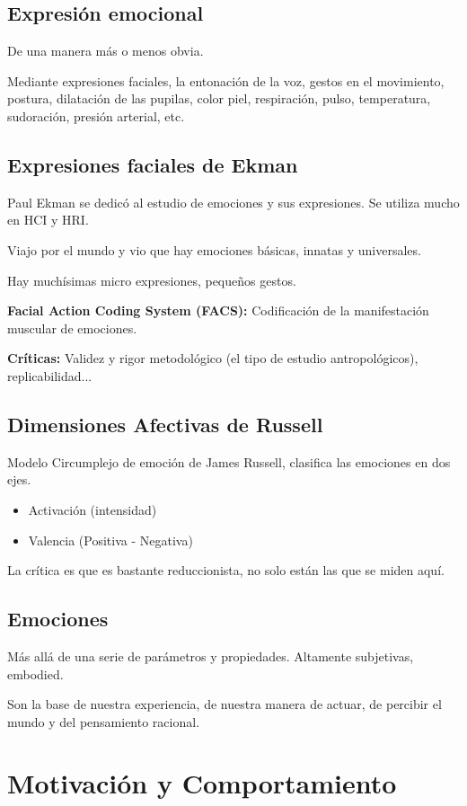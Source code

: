 \documentclass[12pt, twoside, openright]{report} %
\begin{document}
\subsection{Expresión emocional}
De una manera más o menos obvia. 

Mediante expresiones faciales, la entonación de la voz, gestos en el movimiento, postura, dilatación de las pupilas, color piel, respiración, pulso, temperatura, sudoración, presión arterial, etc.

\subsection{Expresiones faciales de Ekman}
Paul Ekman se dedicó al estudio de emociones y sus expresiones. Se utiliza mucho en HCI y HRI.

Viajo por el mundo y vio que hay emociones básicas, innatas y universales.
  
Hay muchísimas micro expresiones, pequeños gestos.
  
\textbf{Facial Action Coding System (FACS):} Codificación de la manifestación muscular de emociones.
  
\textbf{Críticas:} Validez y rigor metodológico (el tipo de estudio antropológicos), replicabilidad...
  
\subsection{Dimensiones Afectivas de Russell}
Modelo Circumplejo de emoción de James Russell, clasifica las emociones en dos ejes.
\begin{itemize}
  \item Activación (intensidad)
  \item Valencia (Positiva - Negativa)
\end{itemize}
La crítica es que es bastante reduccionista, no solo están las que se miden aquí.

\subsection{Emociones}
Más allá de una serie de parámetros y propiedades. Altamente subjetivas, embodied.

Son la base de nuestra experiencia, de nuestra manera de actuar, de percibir el mundo y del pensamiento racional.

\section{Motivación y Comportamiento}
\end{document}
